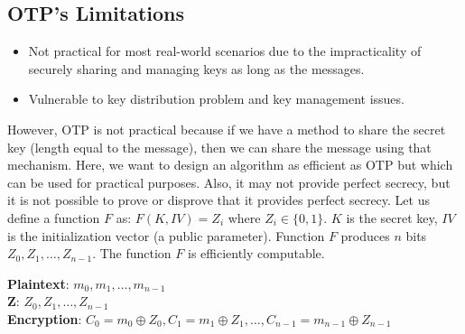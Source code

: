 \documentclass[11pt]{article}
\begin{document}
\subsection{OTP's Limitations}

\begin{itemize}
    \item Not practical for most real-world scenarios due to the impracticality of securely sharing and managing keys as long as the messages.
    \item Vulnerable to key distribution problem and key management issues.
\end{itemize}

However, OTP is not practical because if we have a method to share the secret key (length equal to the message), then we can share the message using that mechanism. Here, we want to design an algorithm as efficient as OTP but which can be used for practical purposes. Also, it may not provide perfect secrecy, but it is not possible to prove or disprove that it provides perfect secrecy. Let us define a function \(F\) as: \(F(K, IV) = Z_i\) where \(Z_i \in \{0, 1\}\). \(K\) is the secret key, \(IV\) is the initialization vector (a public parameter). Function \(F\) produces \(n\) bits \(Z_0, Z_1, \ldots, Z_{n-1}\). The function \(F\) is efficiently computable.

\textbf{Plaintext}: \(m_0, m_1, \ldots, m_{n-1}\) \\
\textbf{Z}: \(Z_0, Z_1, \ldots, Z_{n-1}\) \\
\textbf{Encryption}: \(C_0 = m_0 \oplus Z_0, C_1 = m_1 \oplus Z_1, \ldots, C_{n-1} = m_{n-1} \oplus Z_{n-1}\)
\end{document}
